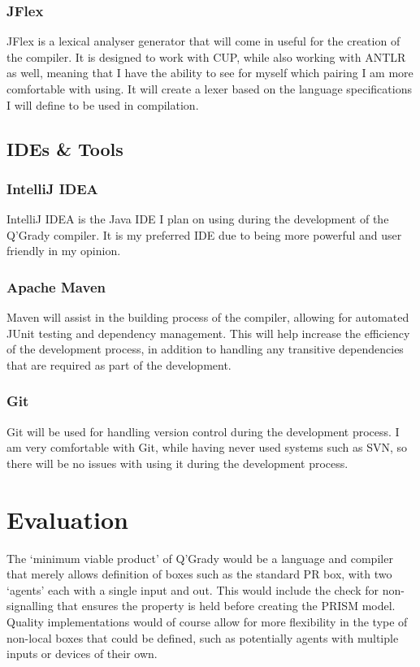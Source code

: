 \documentclass[11pt, a4paper]{article}
\begin{document}
\subsubsection{JFlex} %
\label{ssub:jflex}
JFlex is a lexical analyser generator that will come in useful for the creation
of the compiler. It is designed to work with CUP, while also working with ANTLR
as well, meaning that I have the ability to see for myself which pairing I am
more comfortable with using. It will create a lexer based on the language
specifications I will define to be used in compilation.

\subsection{IDEs \& Tools} %
\label{sub:ides_tools}
\subsubsection{IntelliJ IDEA} %
IntelliJ IDEA is the Java IDE I plan on using during the development of the
Q'Grady compiler. It is my preferred IDE due to being more powerful and user
friendly in my opinion.
\label{ssub:intellij_idea}
\subsubsection{Apache Maven} %
\label{ssub:apache_maven}
Maven will assist in the building process of the compiler, allowing for 
automated JUnit testing and dependency management. This will help increase the
efficiency of the development process, in addition to handling any transitive
dependencies that are required as part of the development.
\subsubsection{Git} %
\label{ssub:git}
Git will be used for handling version control during the development process. I
am very comfortable with Git, while having never used systems such as SVN, so
there will be no issues with using it during the development process.


\section{Evaluation} %
\label{sec:evaluation}
The `minimum viable product' of Q'Grady would be a language and compiler
that merely allows definition of boxes such as the standard PR box, with two
`agents' each with a single input and out. This would include the check for
non-signalling that ensures the property is held before creating the PRISM
model. Quality implementations would of course allow for more flexibility in the
type of non-local boxes that could be defined, such as potentially agents with
multiple inputs or devices of their own.
\end{document}
